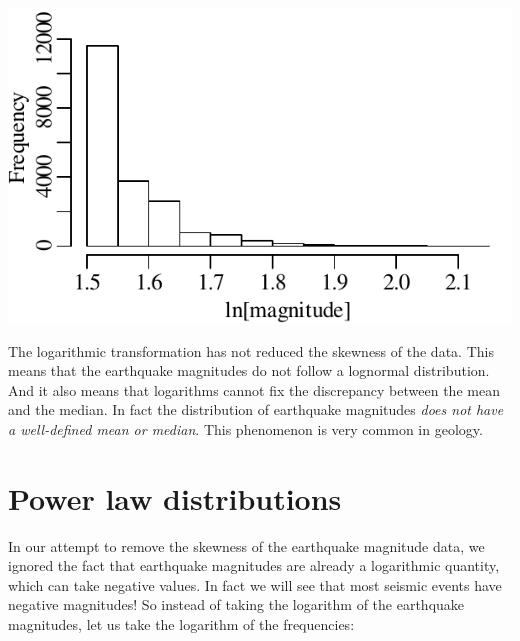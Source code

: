 \noindent\begin{minipage}[t][][b]{.4\textwidth}
  \includegraphics[width=\textwidth]{../figures/recentlogquakes.pdf}\\
\end{minipage}
\begin{minipage}[t][][t]{.6\textwidth}
  \label{fig:recentlogquakes}
\end{minipage}

The logarithmic transformation has not reduced the skewness of the
data. This means that the earthquake magnitudes do not follow a
lognormal distribution. And it also means that logarithms cannot fix
the discrepancy between the mean and the median. In fact the
distribution of earthquake magnitudes \emph{does not have a
  well-defined mean or median}. This phenomenon is very common in
geology.

\section{Power law distributions}
\label{sec:power-law}

In our attempt to remove the skewness of the earthquake magnitude
data, we ignored the fact that earthquake magnitudes are already a
logarithmic quantity, which can take negative values. In fact we will
see that most seismic events have negative magnitudes!  So instead of
taking the logarithm of the earthquake magnitudes, let us take the
logarithm of the frequencies:

